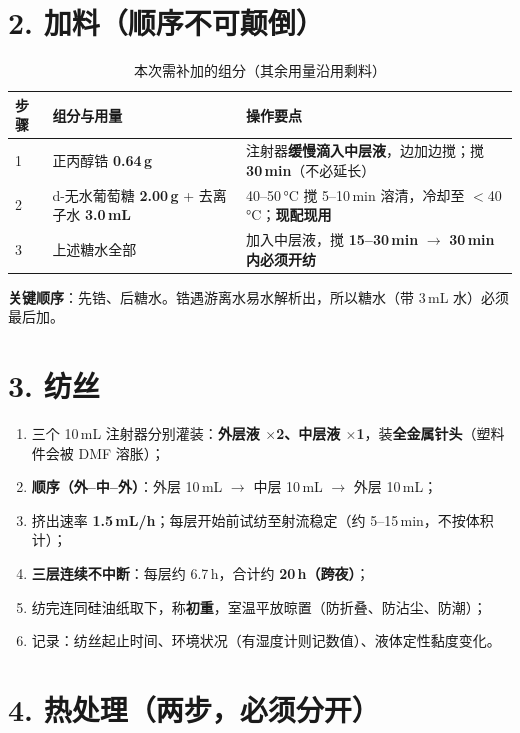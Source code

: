\documentclass[a4paper, 11pt]{ctexart}
\begin{document}
\section*{2. 加料（顺序不可颠倒）}
\begin{table}[htbp]
\centering
\caption{本次需补加的组分（其余用量沿用剩料）}
\begin{tabularx}{\textwidth}{l l X}
\toprule
步骤 & 组分与用量 & 操作要点 \\
\midrule
1 & 正丙醇锆 \textbf{0.64\,g} & 注射器\textbf{缓慢滴入中层液}，边加边搅；搅 \textbf{30\,min}（不必延长） \\
2 & d-无水葡萄糖 \textbf{2.00\,g} + 去离子水 \textbf{3.0\,mL} & 40--50\,°C 搅 5--10\,min 溶清，冷却至 $<$40\,°C；\textbf{现配现用} \\
3 & 上述糖水全部 & 加入中层液，搅 \textbf{15--30\,min} $\rightarrow$ \textbf{30\,min 内必须开纺} \\
\bottomrule
\end{tabularx}
\end{table}

\noindent\textbf{关键顺序}：先锆、后糖水。锆遇游离水易水解析出，所以糖水（带 3\,mL 水）必须最后加。

\section*{3. 纺丝}
\begin{enumerate}
  \item 三个 10\,mL 注射器分别灌装：\textbf{外层液 $\times$2、中层液 $\times$1}，装\textbf{全金属针头}（塑料件会被 DMF 溶胀）；
  \item \textbf{顺序（外--中--外）}：外层 10\,mL $\rightarrow$ 中层 10\,mL $\rightarrow$ 外层 10\,mL；
  \item 挤出速率 \textbf{1.5\,mL/h}；每层开始前试纺至射流稳定（约 5--15\,min，不按体积计）；
  \item \textbf{三层连续不中断}：每层约 6.7\,h，合计约 \textbf{20\,h（跨夜）}；
  \item 纺完连同硅油纸取下，称\textbf{初重}，室温平放晾置（防折叠、防沾尘、防潮）；
  \item 记录：纺丝起止时间、环境状况（有湿度计则记数值）、液体定性黏度变化。
\end{enumerate}

\section*{4. 热处理（两步，必须分开）}
\end{document}

